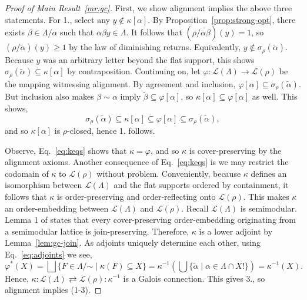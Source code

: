 \documentclass[11pt]{article}
\newcommand{\glang}{\Lambda}
\providecommand{\L}{}
\renewcommand{\L}{\mathscr{L}}
\begin{document}
\begin{proof}[Proof of Main Result~\ref{mr:gc}]
    First, we show alignment implies the above three statements.
    For 1., select any $y\notin\kappa[\alpha]$.
    By Proposition~\ref{prop:strong-opt}, there exists $\beta\in\glang/\alpha$ such that $\alpha\beta y \in \glang$.
    It follows that $(\rho/\widetilde{\alpha\beta})(y) = 1$, so $(\rho/\widetilde{\alpha})(y) \geq 1$ by the law of diminishing returns.
    Equivalently, $y \notin \sigma_\rho(\widetilde{\alpha})$.
    Because $y$ was an arbitrary letter beyond the flat support, this shows $\sigma_\rho(\widetilde{\alpha})\subseteq \kappa[\alpha]$ by contraposition.
    Continuing on, let $\varphi:\mathscr{L}(\glang)\to\mathscr{L}(\rho)$ be the mapping witnessing alignment.
    By agreement and inclusion, $\varphi[\alpha] \subseteq \sigma_\rho(\widetilde{\alpha})$.
    But inclusion also makes $\beta\sim\alpha$ imply $\widetilde{\beta}\subseteq \varphi[\alpha]$, so
    $\kappa[\alpha]\subseteq \varphi[\alpha]$ as well.
    This shows,
    \begin{equation}\label{eq:keqs}
        \sigma_\rho(\widetilde{\alpha}) \subseteq \kappa[\alpha] \subseteq \varphi[\alpha] \subseteq\sigma_\rho(\widetilde{\alpha}),
    \end{equation}
    and so $\kappa[\alpha]$ is $\rho$-closed, hence 1. follows.

    Observe, Eq.~\ref{eq:keqs} shows that $\kappa = \varphi$, and so $\kappa$ is cover-preserving by the alignment axioms.
    Another consequence of Eq.~\ref{eq:keqs} is we may restrict the codomain of $\kappa$ to $\L(\rho)$ without problem.
    Conveniently, because $\kappa$ defines an isomorphism between $\L(\glang)$ and the flat supports ordered by containment, it follows that $\kappa$ is order-preserving and order-reflecting onto $\L(\rho)$.
    This makes $\kappa$ an order-embedding between $\L(\glang)$ and $\L(\rho)$.
    Recall $\L(\glang)$ is semimodular.
    Lemma 1 of \cite{wild1993cover} states that every cover-preserving order-embedding originating from a semimodular lattice is join-preserving.
    Therefore, $\kappa$ is a lower adjoint by Lemma~\ref{lem:gc-join}.
    As adjoints uniquely determine each other, using Eq.~\ref{eq:adjoints} we see,
    \[
        \varphi^*(X) = \bigsqcup\{F\in\glang/\mathord{\sim}\mid \kappa(F) \subseteq X\} = \kappa^{-1}\left(\bigcup\{\widetilde{\alpha}\mid \alpha \in \glang\cap X!\}\right) = \kappa^{-1}(X).
    \]
    Hence, $\kappa:\L(\glang)\rightleftarrows\L(\rho):\kappa^{-1}$ is a Galois connection.
    This gives 3., so alignment implies (1-3).


\end{proof}
\end{document}
